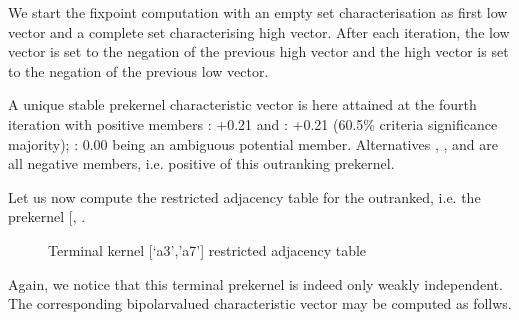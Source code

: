 \documentclass[a4paper,10pt,english]{sphinxhowto}
\let\sphinxpxdimen\pdfpxdimen\else\newdimen\sphinxpxdimen
\begin{document}
We start the fixpoint computation with an empty set characterisation as first low vector and a complete set  characterising high vector. After each iteration, the low vector is set to the negation of the previous high vector and the high vector is set to the negation of the previous low vector.

A unique stable prekernel characteristic vector  is here attained at the fourth iteration with positive members : +0.21 and : +0.21 (60.5\% criteria significance majority); : 0.00 being an ambiguous potential member. Alternatives , ,  and  are all negative members, i.e. positive  of this outranking prekernel.

Let us now compute the restricted adjacency table for the outranked, i.e. the  prekernel {[}, \sphinxstyleemphasis{a7}{]}.

\begin{sphinxVerbatim}[commandchars=\\\{\},numbers=left,firstnumber=1,stepnumber=1]
\end{sphinxVerbatim}

\begin{figure}[htbp]
\centering
\capstart

\noindent\sphinxincludegraphics[width=400\sphinxpxdimen]{{k2restricted}.png}
\caption{Terminal kernel {[}‘a3’,’a7’{]} restricted adjacency table}\label{\detokenize{tutorial:id145}}\end{figure}

Again, we notice that this terminal prekernel is indeed only weakly independent. The corresponding bipolar\sphinxhyphen{}valued characteristic vector  may be computed as follws.
\end{document}
